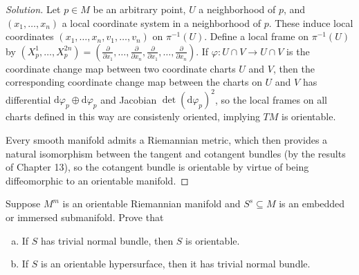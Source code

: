 \documentclass[10pt]{article}
\newcommand{\dd}{\mathrm{d}}
\providecommand{\ii}{\item}
\providecommand{\inv}{^{-1}}
\newenvironment{soln}{\begin{proof}[Solution]}{\end{proof}}
\providecommand{\tanvec}[1]{\frac{\partial}{\partial #1}}
\begin{document}
\begin{soln}
    Let $p\in M$ be an arbitrary point, $U$ a neighborhood of $p$,
    and $(x_1,\dots,x_n)$ a local coordinate system
    in a neighborhood of $p$. These induce local coordinates
    $(x_1,\dots,x_n,v_1,\dots,v_n)$ on $\pi\inv(U)$.
    Define a local frame on $\pi\inv(U)$ by
    $(X^1_p, \dots, X^{2n}_p)
    = (\tanvec{x_1},\dots,\tanvec{x_n},\tanvec{x_1},\dots,\tanvec{x_n})$.
    If $\varphi\colon U\cap V\to U\cap V$ is the
    coordinate change map between two coordinate charts $U$ and $V$,
    then the corresponding coordinate change map
    between the charts on $U$ and $V$ has differential
    $\dd\varphi_p\oplus\dd\varphi_p$
    and Jacobian $\det(\dd\varphi_p)^2$,
    so the local frames on all charts defined in this way
    are consistenly oriented, implying $TM$ is orientable.

    Every smooth manifold admits a Riemannian metric,
    which then provides a natural isomorphism
    between the tangent and cotangent bundles
    (by the results of Chapter 13), so the cotangent bundle is orientable
    by virtue of being diffeomorphic to an orientable manifold.
\end{soln}

\begin{problem}
    [15-8]
    Suppose $M^m$ is an orientable Riemannian manifold
    and $S^s\subseteq M$ is an embedded or immersed submanifold.
    Prove that
    \begin{enumerate}[(a)]
        \ii If $S$ has trivial normal bundle, then $S$ is orientable.
	\ii If $S$ is an orientable hypersurface,
	then it has trivial normal bundle.
    \end{enumerate}
\end{problem}
\end{document}
